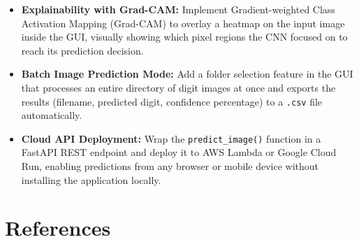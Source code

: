 \documentclass[12pt,a4paper,openany]{report}
\begin{document}
\begin{itemize}
    \item \textbf{Explainability with Grad-CAM:} Implement Gradient-weighted Class Activation Mapping (Grad-CAM) to overlay a heatmap on the input image inside the GUI, visually showing which pixel regions the CNN focused on to reach its prediction decision.
    \item \textbf{Batch Image Prediction Mode:} Add a folder selection feature in the GUI that processes an entire directory of digit images at once and exports the results (filename, predicted digit, confidence percentage) to a \texttt{.csv} file automatically.
    \item \textbf{Cloud API Deployment:} Wrap the \texttt{predict\_image()} function in a FastAPI REST endpoint and deploy it to AWS Lambda or Google Cloud Run, enabling predictions from any browser or mobile device without installing the application locally.
\end{itemize}

\chapter{References}
\end{document}

